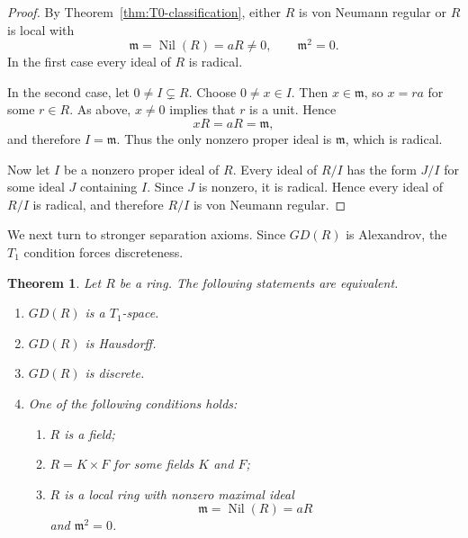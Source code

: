 \documentclass[11pt]{amsart}
\theoremstyle{plain}
\newtheorem{theorem}{Theorem}[section]
\theoremstyle{definition}
\theoremstyle{remark}
\numberwithin{equation}{section}
\begin{document}
\begin{proof}
	By Theorem~\ref{thm:T0-classification}, either $R$ is von Neumann
	regular or $R$ is local with
	\[
	\mathfrak m=\operatorname{Nil}(R)=aR\neq0,
	\qquad
	\mathfrak m^2=0.
	\]
	In the first case every ideal of $R$ is radical.
	
	In the second case, let $0\neq I\subsetneq R$. Choose $0\neq x\in I$.
	Then $x\in\mathfrak m$, so $x=ra$ for some $r\in R$. As above,
	$x\neq0$ implies that $r$ is a unit. Hence
	\[
	xR=aR=\mathfrak m,
	\]
	and therefore $I=\mathfrak m$. Thus the only nonzero proper ideal is
	$\mathfrak m$, which is radical.
	
	Now let $I$ be a nonzero proper ideal of $R$. Every ideal of $R/I$
	has the form $J/I$ for some ideal $J$ containing $I$. Since $J$ is
	nonzero, it is radical. Hence every ideal of $R/I$ is radical, and
	therefore $R/I$ is von Neumann regular.
\end{proof}


We next turn to stronger separation axioms. Since $GD(R)$ is Alexandrov,
the $T_1$ condition forces discreteness.

\begin{theorem}\label{thm:discrete}
	Let $R$ be a ring. The following statements are equivalent.
	\begin{enumerate}
		\item $GD(R)$ is a $T_1$-space.
		\item $GD(R)$ is Hausdorff.
		\item $GD(R)$ is discrete.
		\item One of the following conditions holds:
		\begin{enumerate}
			\item $R$ is a field;
			\item $R=K\times F$ for some fields $K$ and $F$;
			\item $R$ is a local ring with nonzero maximal ideal
			\[
			\mathfrak m=\operatorname{Nil}(R)=aR
			\]
			and $\mathfrak m^2=0$.
		\end{enumerate}
	\end{enumerate}
\end{theorem}
\end{document}
